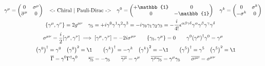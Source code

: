 \begin{gather*}
        \gamma^\mu = \begin{pmatrix}
                0                     &\sigma^\mu \\
                \overline{\sigma}^\mu &0          \\
        \end{pmatrix}
        \qqtext{<- Chiral | Pauli-Dirac ->}
        \gamma^0 = \begin{pmatrix}
                +\mathbb{1} &0           \\
                0           &-\mathbb{1} \\
        \end{pmatrix}
        \quad
        \gamma^k = \begin{pmatrix}
                0         &\sigma^k \\
                -\sigma^k &0        \\
        \end{pmatrix}
        \\
        \acomm{\gamma^\mu}{\gamma^\nu} = 2g^{\mu\nu}
        \quad
        \gamma_5
        = +i\gamma^0\gamma^1\gamma^2\gamma^3
        = -i\gamma_0\gamma_1\gamma_2\gamma_3
        = -\frac{i}{4!}\epsilon^{\alpha\beta\gamma\delta} \gamma^\alpha\gamma^\beta\gamma^\gamma\gamma^\delta
        \quad
        \\
        \sigma^{\mu\nu} = \frac{i}{2}\comm{\gamma^\mu}{\gamma^\nu}
        \implies \comm{\gamma^\mu}{\gamma^\nu} = -2i\sigma^{\mu\nu}
        \qquad
        \acomm{\gamma_5}{\gamma^\mu} = 0
        \qquad
        \gamma^0\qty(\gamma^\mu)^\dagger\gamma^0 = \gamma^\mu
        \\
        \quad
        \qty(\gamma^0)^\dagger = \gamma^0
        \quad
        \qty(\gamma^0)^2 = \1
        \qquad
        \qty(\gamma^k)^\dagger = -\gamma^k
        \quad
        \qty(\gamma^k)^2 = -\1
        \qquad
        \qty(\gamma^5)^\dagger = \gamma^5
        \quad
        \qty(\gamma^5)^2 = \1
        \\
        \overline{\Gamma} = \gamma^0\Gamma^\dagger\gamma^0
        \qquad
        \overline{\gamma_5} = -\gamma_5
        \qquad
        \overline{\gamma^\mu} = \gamma^\mu
        \qquad
        \overline{\gamma^\mu\gamma_5} = \gamma^\mu\gamma_5
        \qquad
        \overline{\sigma^{\mu\nu}} = \sigma^{\mu\nu}
\end{gather*}

